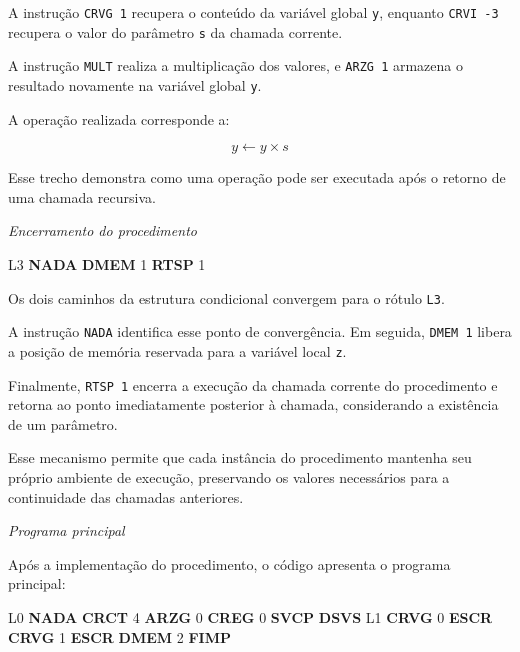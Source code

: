 \documentclass[
  brazilian,
  letterpaper,
]{book}
\newenvironment{Shaded}{\begin{snugshade}}{\end{snugshade}}
\newcommand{\DecValTok}[1]{\textcolor[rgb]{0.68,0.00,0.00}{#1}}
\newcommand{\FunctionTok}[1]{\textcolor[rgb]{0.28,0.35,0.67}{#1}}
\newcommand{\KeywordTok}[1]{\textcolor[rgb]{0.00,0.23,0.31}{\textbf{#1}}}
\theoremstyle{plain}
\theoremstyle{definition}
\theoremstyle{remark}
\begin{document}
A instrução \texttt{CRVG\ 1} recupera o conteúdo da variável global
\texttt{y}, enquanto \texttt{CRVI\ -3} recupera o valor do parâmetro
\texttt{s} da chamada corrente.

A instrução \texttt{MULT} realiza a multiplicação dos valores, e
\texttt{ARZG\ 1} armazena o resultado novamente na variável global
\texttt{y}.

A operação realizada corresponde a:

\[ y \leftarrow y \times s \]

Esse trecho demonstra como uma operação pode ser executada após o
retorno de uma chamada recursiva.

\emph{Encerramento do procedimento}

\begin{Shaded}
\begin{Highlighting}[]
\FunctionTok{L3}  \KeywordTok{NADA}
    \KeywordTok{DMEM}    \DecValTok{1}
    \KeywordTok{RTSP}    \DecValTok{1}
\end{Highlighting}
\end{Shaded}

Os dois caminhos da estrutura condicional convergem para o rótulo
\texttt{L3}.

A instrução \texttt{NADA} identifica esse ponto de convergência. Em
seguida, \texttt{DMEM\ 1} libera a posição de memória reservada para a
variável local \texttt{z}.

Finalmente, \texttt{RTSP\ 1} encerra a execução da chamada corrente do
procedimento e retorna ao ponto imediatamente posterior à chamada,
considerando a existência de um parâmetro.

Esse mecanismo permite que cada instância do procedimento mantenha seu
próprio ambiente de execução, preservando os valores necessários para a
continuidade das chamadas anteriores.

\emph{Programa principal}

Após a implementação do procedimento, o código apresenta o programa
principal:

\begin{Shaded}
\begin{Highlighting}[]
\FunctionTok{L0}  \KeywordTok{NADA}
    \KeywordTok{CRCT}    \DecValTok{4}
    \KeywordTok{ARZG}    \DecValTok{0}
    \KeywordTok{CREG}    \DecValTok{0}
    \KeywordTok{SVCP}
    \KeywordTok{DSVS}    \FunctionTok{L1}
    \KeywordTok{CRVG}    \DecValTok{0}
    \KeywordTok{ESCR}
    \KeywordTok{CRVG}    \DecValTok{1}
    \KeywordTok{ESCR}
    \KeywordTok{DMEM}    \DecValTok{2}
    \KeywordTok{FIMP}
\end{Highlighting}
\end{Shaded}
\end{document}

